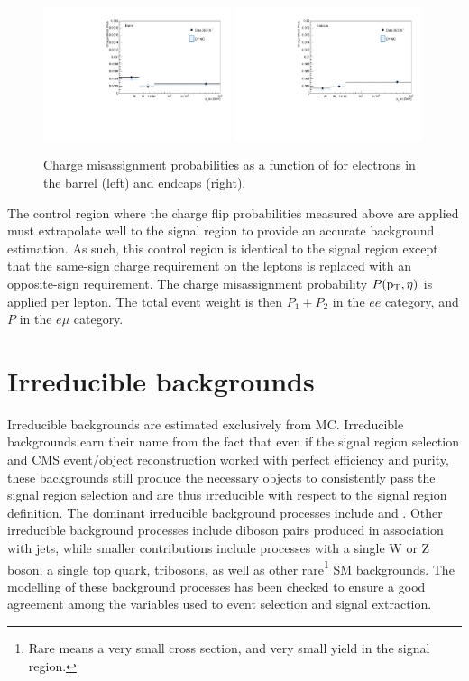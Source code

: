 \begin{figure}[htp]
\centering
\includegraphics[width=0.49\textwidth]{ch8_figs/chmid_prob_barrel.pdf}
\includegraphics[width=0.49\textwidth]{ch8_figs/chmid_prob_endcap.pdf}\\
\caption[Electron charge misassignment probabilities in data and MC.]{Charge misassignment probabilities as a function of \pt for electrons in the barrel (left) and endcaps (right).}
\label{fig:fliprate}
\end{figure}
 
The control region where the charge flip probabilities measured above are applied must extrapolate well to the signal region to provide an accurate background estimation. As such, this control region
is identical to the signal region except that the same-sign charge requirement on the leptons is replaced with an opposite-sign requirement.
The charge misassignment probability $P(\mathrm{p}_{\mathrm{T}},\eta)$ is applied per lepton. The total event weight is then $P_{1} + P_{2}$ in the $ee$ category, and $P$ in the $e\mu$ category.  

\section{Irreducible backgrounds}
Irreducible backgrounds are estimated exclusively from MC. Irreducible backgrounds earn their name from the fact that even if the signal region selection and CMS event/object reconstruction
worked with perfect efficiency and purity, these backgrounds still produce the necessary objects to consistently pass the signal region selection and are thus irreducible with respect to the signal
region definition. The dominant irreducible background processes include \ttw and \ttz. Other irreducible background processes include diboson pairs produced in association with jets,
while smaller contributions include processes with a single W or Z boson, a single top quark, tribosons, as well as other rare\footnote{Rare means a very small cross section, and very
small yield in the signal region.} SM backgrounds. The modelling of these background processes has been checked to ensure a good agreement among the variables used to event selection and
signal extraction.  

